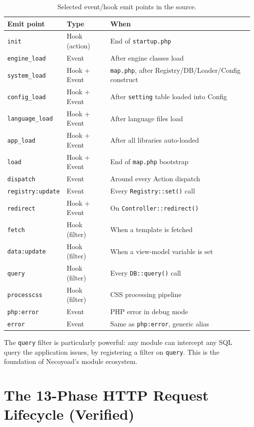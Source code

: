 \documentclass[11pt,a4paper]{article}
\begin{document}
\begin{table}[htbp]
\centering
\caption{Selected event/hook emit points in the source.}\label{tab:emit-points}
\small
\begin{tabularx}{\columnwidth}{llX}
\toprule
\textbf{Emit point} & \textbf{Type} & \textbf{When} \\
\midrule
\texttt{init} & Hook (action) & End of \texttt{startup.php} \\
\texttt{engine\_load} & Event & After engine classes load \\
\texttt{system\_load} & Hook + Event & \texttt{map.php}, after Registry/DB/Loader/Config construct \\
\texttt{config\_load} & Hook + Event & After \texttt{setting} table loaded into Config \\
\texttt{language\_load} & Hook + Event & After language files load \\
\texttt{app\_load} & Hook + Event & After all libraries auto-loaded \\
\texttt{load} & Hook + Event & End of \texttt{map.php} bootstrap \\
\texttt{dispatch} & Event & Around every Action dispatch \\
\texttt{registry:update} & Event & Every \texttt{Registry::set()} call \\
\texttt{redirect} & Hook + Event & On \texttt{Controller::redirect()} \\
\texttt{fetch} & Hook (filter) & When a template is fetched \\
\texttt{data:update} & Hook (filter) & When a view-model variable is set \\
\texttt{query} & Hook (filter) & Every \texttt{DB::query()} call \\
\texttt{processcss} & Hook (filter) & CSS processing pipeline \\
\texttt{php:error} & Event & PHP error in debug mode \\
\texttt{error} & Event & Same as \texttt{php:error}, generic alias \\
\bottomrule
\end{tabularx}
\end{table}

The \texttt{query} filter is particularly powerful: any module can
intercept any SQL query the application issues, by registering a
filter on \texttt{query}. This is the foundation of Necoyoad's
module ecosystem.

\section{The 13-Phase HTTP Request Lifecycle (Verified)}\label{sec:lifecycle-v2}
\end{document}
